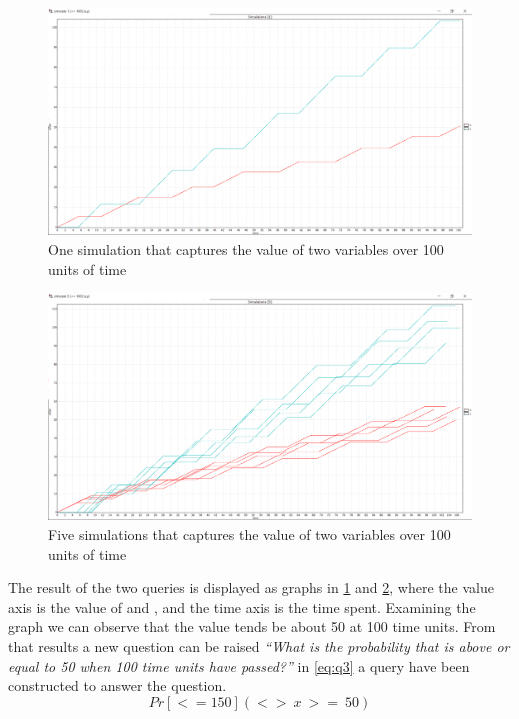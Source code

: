 \begin{figure}[!h]
	\includegraphics[width=\textwidth]{graphics/showcase01.png}
	\caption{One simulation that captures the value of two variables  over 100 units of time}
	\label{fig:sim01}
\end{figure}

\begin{figure}[!h]
	\includegraphics[width=\textwidth]{graphics/showcase02.png}
	\caption{Five simulations that captures the value of two variables  over 100 units of time}
	\label{fig:sim02}
\end{figure}

The result of the two queries is displayed as graphs in \cref{fig:sim01} and \cref{fig:sim02}, where the value axis is the value of  and , and the time axis is the time spent.
Examining the graph we can observe that the value  tends be about 50 at 100 time units.
From that results a new question can be raised \textit{``What is the probability that  is above or equal to 50 when 100 time units have passed?''} in \ref{eq:q3} a query have been constructed to answer the question.
\begin{equation}\label{eq:q3}
Pr[<=150](<>\ x\ >=\ 50)
\end{equation}

